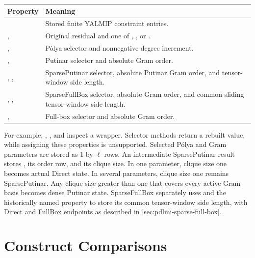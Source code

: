 \begin{tabularx}{\textwidth}{@{}>{\raggedright\arraybackslash}p{}Y@{}}
\toprule
Property & Meaning \\
\midrule
{} & Stored finite YALMIP constraint entries. \\
,  & Original  residual and one of , , or . \\
,  & P\'olya selector and nonnegative degree increment. \\
,  & Putinar selector and absolute Gram order. \\
, ,  & SparsePutinar selector, absolute Putinar Gram order, and tensor-window side length. \\
, ,  & SparseFullBox selector, absolute Gram order, and common sliding tensor-window side length. \\
,  & Full-box selector and absolute Gram order. \\
\bottomrule
\end{tabularx}

For example, , , and  inspect a wrapper. Selector methods return a rebuilt value, while assigning these properties is unsupported. Selected P\'olya and Gram parameters are stored as $1$-by-$\ell$ rows. An intermediate SparsePutinar result stores , its order row, and its clique size. In one parameter, clique size one becomes actual Direct state. In several parameters, clique size one remains SparsePutinar. Any clique size greater than one that covers every active Gram basis becomes dense Putinar state. SparseFullBox separately uses  and the historically named  property to store its common tensor-window side length, with Direct and FullBox endpoints as described in \cref{sec:pdlmi-sparse-full-box}.

\section{Construct \texorpdfstring{}{pdlmi} Comparisons}
\label{sec:pdlmi-construction}

